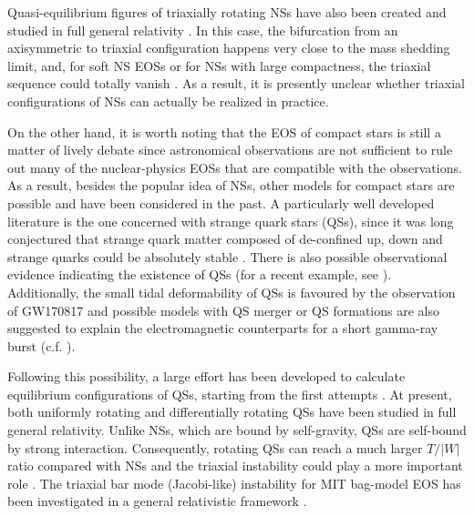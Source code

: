 \documentclass[twocolumn,superscriptaddress,showpacs,prd,aps,amsmath,amssymb,nofootinbib]{revtex4-1}
\begin{document}
Quasi-equilibrium figures of triaxially rotating NSs have also been
created and studied in full general relativity \cite{Huang08, Uryu2016a}.
In this case, the bifurcation from an axisymmetric to triaxial
configuration happens very close to the mass shedding limit, and, for
soft NS EOSs or for NSs with large compactness, the triaxial sequence
could totally vanish \cite{Jame64, Bonazzola1996b, Bonazzola1998c,
  hachisu1982,Lai93}. As a result, it is presently unclear whether
triaxial configurations of NSs can actually be realized
in practice.

On the other hand, it is worth noting that the EOS of compact stars is
still a matter of lively debate since astronomical observations are not
sufficient to rule out many of the nuclear-physics EOSs that are
compatible with the observations. As a result, besides the popular idea
of NSs, other models for compact stars are possible and have been
considered in the past. A particularly well developed literature is the
one concerned with strange quark stars (QSs), since it was long
conjectured that strange quark matter composed of de-confined up, down
and strange quarks could be absolutely stable
\cite{Bodmer1971,Witten84}. There is also possible observational evidence
indicating the existence of QSs (for a recent example, see
\cite{Dai_ZG:2016}). Additionally, the small tidal deformability of QSs
is favoured by the observation of GW170817 \cite{Lai2017b} and possible
models with QS merger or QS formations are also suggested to explain the
electromagnetic counterparts for a short gamma-ray burst
(c.f. \cite{Li2016,Lai2017b}).

Following this possibility, a large effort has been developed to
calculate equilibrium configurations of QSs, starting 
from the first attempts \cite{Itoh70,Alcock86,Haensel1986}. At present,
both uniformly rotating \cite{rosinska2000b, gourgoulhon1999,
  Stergioulas99a} and differentially rotating QSs \cite{szkudlarek2012}
have been studied in full general relativity. Unlike NSs, which are bound
by self-gravity, QSs are self-bound by strong interaction. Consequently,
rotating QSs can reach a much larger $T/|W|$ ratio compared with NSs and
the triaxial instability could play a more important role
\cite{rosinska2000a, rosinska2000b, rosinska2001}. The triaxial bar mode
(Jacobi-like) instability for MIT bag-model EOS has been investigated in
a general relativistic framework \cite{rosinska2003}.
\end{document}
